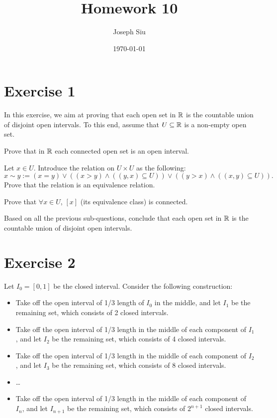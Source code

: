 \documentclass{homework}
\author{Joseph Siu}
\date{\today}
\title{Homework 10}
\newcommand{\R}{\bb{R}} %
\newcommand{\?}{\stackrel{?}{=}}
\theoremstyle{definition}
\begin{document}
 \maketitle


\section*{Exercise 1}
In this exercise, we aim at proving that each open set in $\R$ is the countable union of disjoint open intervals. To this end, assume that $U\subseteq\R$ is a non-empty open set.

\question[1] Prove that in $\R$ each connected open set is an open interval.

\question[2] Let $x\in U$. Introduce the relation on $U\times U$ as the following:\[x\sim y:=(x=y)\lor((x>y)\land((y,x)\subseteq U))\lor((y>x)\land((x,y)\subseteq U)).\] Prove that the relation is an equivalence relation.

\question[3] Prove that $\forall x\in U$, $[x]$ (its equivalence class) is connected.

\question[4] Based on all the previous sub-questions, conclude that each open set in $\R$ is the countable union of disjoint open intervals.


\newpage
\section*{Exercise 2}
Let $I_0=[0,1]$ be the closed interval. Consider the following construction:
\begin{itemize}
    \item Take off the open interval of 1/3 length of $I_0$ in the middle, and let $I_1$ be the remaining set, which consists of 2 closed intervals.
    \item Take off the open interval of 1/3 length in the middle of each component of $I_1$, and let $I_2$ be the remaining set, which consists of 4 closed intervals.
    \item Take off the open interval of 1/3 length in the middle of each component of $I_2$, and let $I_3$ be the remaining set, which consists of 8 closed intervals.
    \item \dots
    \item Take off the open interval of 1/3 length in the middle of each component of $I_n$, and let $I_{n+1}$ be the remaining set, which consists of $2^{n+1}$ closed intervals.
\end{itemize}
\end{document}
